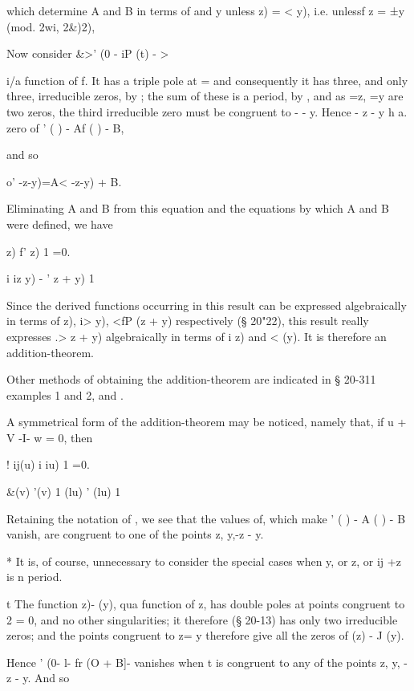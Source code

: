 {which determine A and B in terms of and y unless z) = < y), i.e.
unlessf z = ±y (mod. 2wi, 2\&)2),

Now consider \&>' (0 - iP (t) - >

 i/a function of f. It has a triple pole at = and consequently it has
three, and only three, irreducible zeros, by ; the sum of these
is a period, by , and as =z, =y are two zeros, the third
irreducible zero must be congruent to - - y. Hence - z - y h a. zero
of ' ( ) - Af ( ) - B,

and so

 o' -z-y)=A< -z-y) + B.

Eliminating A and B from this equation and the equations by which A
and B were defined, we have

  z) f' z) 1 =0.

i iz y) - ' z + y) 1

Since the derived functions occurring in this result can be expressed
algebraically in terms of z), i> y), <fP (z + y) respectively (§
20"22), this result really expresses .> z + y) algebraically in terms
of i z) and < (y). It is therefore an addition-theorem.

Other methods of obtaining the addition-theorem are indicated in §
20-311 examples 1 and 2, and .

A symmetrical form of the addition-theorem may be noticed, namely
that, if u + V -I- w = 0, then

! ij(u) i iu) 1 =0.

\&(v) '(v) 1 (lu) ' (lu) 1


Retaining the notation of , we see that the values of, which
make ' ( ) - A ( ) - B vanish, are congruent to one of the points z,
y,-z - y.

* It is, of course, unnecessary to consider the special cases when y,
or z, or ij +z is n period.

t The function z)- (y), qua function of z, has double poles at points
congruent to 2 = 0, and no other singularities; it therefore (§
20-13) has only two irreducible zeros; and the points congruent to z=
y therefore give all the zeros of (z) - J (y).

%
%

Hence ' (0- l- fr (O + B]- vanishes when t is congruent to any of the
points z, y, - z - y. And so

}
